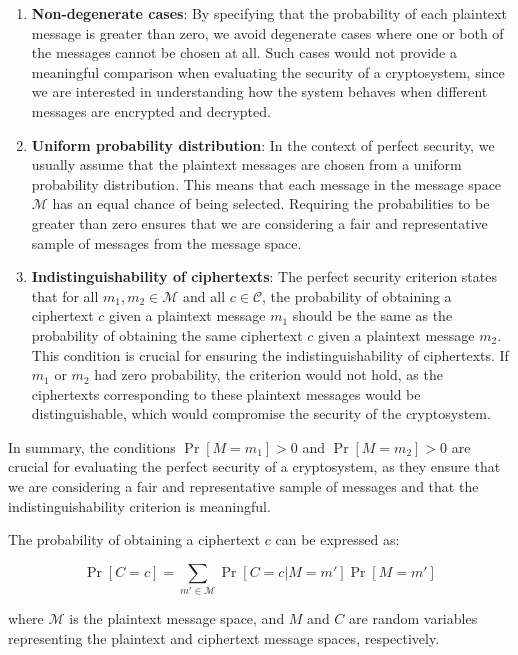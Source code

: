 \documentclass[12pt,openany]{book}
\theoremstyle{definition}
\begin{document}
	\begin{enumerate}
		\item 
		\textbf{Non-degenerate cases}: By specifying that the probability of each plaintext message is greater than zero, we avoid degenerate cases where one or both of the messages cannot be chosen at all. Such cases would not provide a meaningful comparison when evaluating the security of a cryptosystem, since we are interested in understanding how the system behaves when different messages are encrypted and decrypted.
		\item
		\textbf{Uniform probability distribution}: In the context of perfect security, we usually assume that the plaintext messages are chosen from a uniform probability distribution. This means that each message in the message space $\mathcal{M}$ has an equal chance of being selected. Requiring the probabilities to be greater than zero ensures that we are considering a fair and representative sample of messages from the message space.
		\item 
		\textbf{Indistinguishability of ciphertexts}: The perfect security criterion states that for all $m_1, m_2 \in \mathcal{M}$ and all $c \in \mathcal{C}$, the probability of obtaining a ciphertext $c$ given a plaintext message $m_1$ should be the same as the probability of obtaining the same ciphertext $c$ given a plaintext message $m_2$. This condition is crucial for ensuring the indistinguishability of ciphertexts. If $m_1$ or $m_2$ had zero probability, the criterion would not hold, as the ciphertexts corresponding to these plaintext messages would be distinguishable, which would compromise the security of the cryptosystem.
	\end{enumerate}
	
	
	In summary, the conditions $\Pr[M = m_1] > 0$ and $\Pr[M = m_2] > 0$ are crucial for evaluating the perfect security of a cryptosystem, as they ensure that we are considering a fair and representative sample of messages and that the indistinguishability criterion is meaningful.
	
	\newpage
	The probability of obtaining a ciphertext $c$ can be expressed as:
	
	\begin{equation}
		\Pr[C = c] = \sum_{m' \in \mathcal{M}} \Pr[C = c | M = m']\Pr[M = m']
	\end{equation}
	
	\noindent where $\mathcal{M}$ is the plaintext message space, and $M$ and $C$ are random variables representing the plaintext and ciphertext message spaces, respectively.
	
\end{document}
